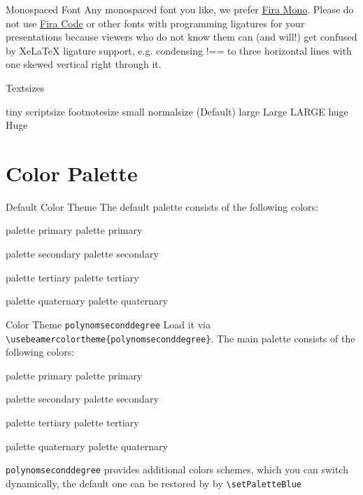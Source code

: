 \documentclass[fragile=singleslide]{beamer}
\begin{document}
\begin{frame}{Monospaced Font}
  Any monospaced font you like, we prefer
  \href{https://mozilla.github.io/Fira/}{Fira Mono}. Please do not use
  \href{https://github.com/tonsky/FiraCode}{Fira Code} or other fonts with 
  programming ligatures for your presentations because viewers who do not 
  know them can (and will!) get confused by XeLaTeX ligature support, e.g.
  condensing !== to three horizontal lines with one skewed vertical right 
  through it.
\end{frame}
 
\begin{frame}{Textsizes}
  
  {\tiny tiny}
  {\scriptsize scriptsize}
  {\footnotesize footnotesize}
  {\small small}
  {\normalsize normalsize} (Default)
  {\large large}
  {\Large Large}
  {\LARGE LARGE}
  {\huge huge}
  {\Huge Huge}
\end{frame}

\section{Color Palette}

\newcommand{\clrbx}[1]{%
  \parbox{5em}{%
    \begin{beamercolorbox}[wd=5em,ht=5ex,dp=1.125ex,center]{#1}%
      \small#1%
    \end{beamercolorbox}%
  }%
}
\newcommand{\paletteColors}{%
  \begin{center}
    \clrbx{palette primary} %
    \clrbx{palette secondary}%
    \clrbx{palette tertiary}%
    \clrbx{palette quaternary}%
  \end{center}
}


\begin{frame}{Default Color Theme}
  The default palette consists of the following colors:\\
  \paletteColors
\end{frame}



\begin{frame}[fragile]{Color Theme \texttt{polynomseconddegree}}
  Load it via \verb|\usebeamercolortheme{polynomseconddegree}|. 
  The main palette consists of the following colors:\\
  \paletteColors
  
  \texttt{polynomseconddegree} provides additional colors schemes,
  which you can switch dynamically, the default one can be restored by by
  \verb|\setPaletteBlue|
\end{frame}
\end{document}
